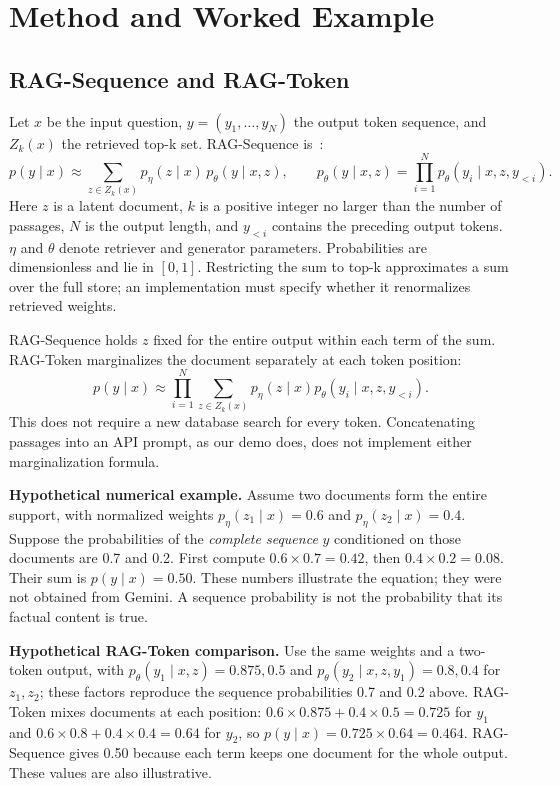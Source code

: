 \documentclass[12pt,a4paper]{article}
\begin{document}
\section{Method and Worked Example}
\subsection*{RAG-Sequence and RAG-Token}
Let $x$ be the input question, $y=(y_1,\ldots,y_N)$ the output token sequence, and $Z_k(x)$ the retrieved top-k set. RAG-Sequence is~\cite{lewis}:
\begin{equation}
p(y\mid x)\approx\sum_{z\in Z_k(x)}p_\eta(z\mid x)\,p_\theta(y\mid x,z),\qquad
p_\theta(y\mid x,z)=\prod_{i=1}^{N}p_\theta(y_i\mid x,z,y_{<i}).
\end{equation}
Here $z$ is a latent document, $k$ is a positive integer no larger than the number of passages, $N$ is the output length, and $y_{<i}$ contains the preceding output tokens. $\eta$ and $\theta$ denote retriever and generator parameters. Probabilities are dimensionless and lie in $[0,1]$. Restricting the sum to top-k approximates a sum over the full store; an implementation must specify whether it renormalizes retrieved weights.

RAG-Sequence holds $z$ fixed for the entire output within each term of the sum. RAG-Token marginalizes the document separately at each token position:
\[p(y\mid x)\approx\prod_{i=1}^{N}\sum_{z\in Z_k(x)}p_\eta(z\mid x)p_\theta(y_i\mid x,z,y_{<i}).\]
This does not require a new database search for every token. Concatenating passages into an API prompt, as our demo does, does not implement either marginalization formula.

\textbf{Hypothetical numerical example.} Assume two documents form the entire support, with normalized weights $p_\eta(z_1\mid x)=0.6$ and $p_\eta(z_2\mid x)=0.4$. Suppose the probabilities of the \emph{complete sequence} $y$ conditioned on those documents are 0.7 and 0.2. First compute $0.6\times0.7=0.42$, then $0.4\times0.2=0.08$. Their sum is $p(y\mid x)=0.50$. These numbers illustrate the equation; they were not obtained from Gemini. A sequence probability is not the probability that its factual content is true.

\textbf{Hypothetical RAG-Token comparison.} Use the same weights and a two-token output, with $p_\theta(y_1\mid x,z)=0.875, 0.5$ and $p_\theta(y_2\mid x,z,y_1)=0.8, 0.4$ for $z_1,z_2$; these factors reproduce the sequence probabilities 0.7 and 0.2 above. RAG-Token mixes documents at each position: $0.6\times0.875+0.4\times0.5=0.725$ for $y_1$ and $0.6\times0.8+0.4\times0.4=0.64$ for $y_2$, so $p(y\mid x)=0.725\times0.64=0.464$. RAG-Sequence gives 0.50 because each term keeps one document for the whole output. These values are also illustrative.
\end{document}
